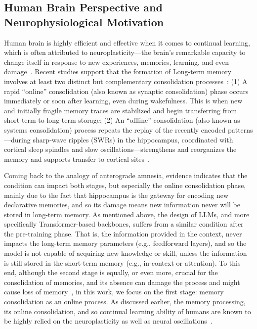 \documentclass{article}
\newcommand{\citep}{\parencite}
\begin{document}
\subsection{Human Brain Perspective and Neurophysiological Motivation}\label{sec:brain-perspective}
Human brain is highly efficient and effective when it comes to continual learning, which is often attributed to neuroplasticity—the brain's remarkable capacity to change itself in response to new experiences, memories, learning, and even damage~\citep{pascual2005plastic, johnston2009plasticity}. Recent studies support that the formation of Long-term memory involves at least two distinct but complementary consolidation processes~\citep{Stepwise-consolidation2021, frey1997synaptic, yang2024selection}: (1) A rapid ``online'' consolidation (also known as synaptic consolidation) phase occurs immediately or soon after learning, even during wakefulness. This is when new and initially fragile memory traces are stabilized and begin transferring from short-term to long-term storage; (2) An ``offline'' consolidation (also known as systems consolidation) process repeats the replay of the recently encoded patterns—during sharp‑wave ripples (SWRs) in the hippocampus, coordinated with cortical sleep spindles and slow oscillations—strengthens and reorganizes the memory and supports transfer to cortical sites~\citep{ji2007coordinated, peyrache2009replay, foster2006reverse}. 

Coming back to the analogy of anterograde amnesia, evidence indicates that the condition can impact both stages, but especially the online consolidation phase, mainly due to the fact that hippocampus is the gateway for encoding new declarative memories, and so its damage means new information never will be stored in long-term memory. As mentioned above, the design of LLMs, and more specifically Transformer-based backbones, suffers from a similar condition after the pre-training phase. That is, the information provided in the context, never impacts the long-term memory parameters (e.g., feedforward layers), and so the model is not capable of acquiring new knowledge or skill, unless the information is still stored in the short-term memory (e.g., in-context or attention). To this end, although the second stage is equally, or even more, crucial for the consolidation of memories, and its absence can damage the process and might cause loss of memory~\citep{drummond2000altered, yoo2007deficit}, in this work, we focus on the first stage: memory consolidation as an online process. As discussed earlier, the memory processing, its online consolidation, and so continual learning ability of humans are known to be highly relied on the neuroplasticity as well as neural oscillations~\citep{bliss1993synaptic, buzsaki2004neuronal, klinzing2019mechanisms}.
\end{document}
